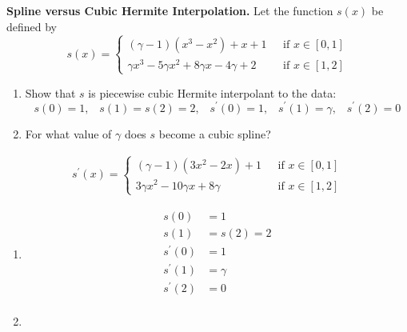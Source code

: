 \textbf{Spline versus Cubic Hermite Interpolation.} Let the function
$s(x)$ be defined by
\[
s(x) = \left\{
\begin{aligned}
(\gamma - 1)(x^3 - x^2) + x + 1 &\,\,\,\, \text{if}\,\, x\in [0,1] \\
\gamma x^3 - 5 \gamma x^2 + 8 \gamma x - 4 \gamma + 2 &\,\,\,\, \text{if}\,\, x\in [1,2]
\end{aligned}
\right.
\]

\begin{enumerate}
\item Show that $s$ is piecewise cubic Hermite interpolant to the
  data:
\[
s(0)=1, \;\;\; s(1)=s(2)=2, \;\;\; s^\prime(0)=1, \;\;\; s^\prime(1) =
\gamma, \;\;\; s^\prime(2)=0
\]
\item For what value of $\gamma$ does $s$ become a cubic spline?
\end{enumerate}

{\color{blue}

\[
\begin{aligned}
s^\prime(x) = \left\{
\begin{aligned}
(\gamma - 1)(3 x^2 - 2x) + 1 &\,\,\,\, \text{if}\,\, x\in [0,1] \\
3 \gamma x^2 - 10 \gamma x + 8 \gamma &\,\,\,\, \text{if}\,\, x\in [1,2]
\end{aligned}
\right.
\end{aligned}
\]

\begin{enumerate}
\item
\[
\begin{aligned}
s(0) &= 1 \\
s(1) &= s(2) = 2 \\
s^\prime(0) &= 1 \\
s^\prime(1) &= \gamma \\
s^\prime(2) &= 0 \\
\end{aligned}
\]

\item



\end{enumerate}

}

